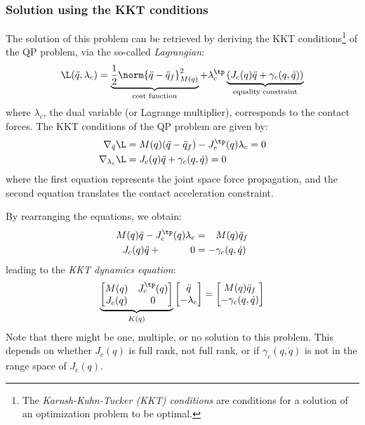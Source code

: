 \subsubsection{Solution using the KKT conditions}
The solution of this problem can be retrieved by deriving the KKT conditions\footnote{The \emph{Karush-Kuhn-Tucker (KKT) conditions} are conditions for a solution of an optimization problem to be optimal.} of the QP problem, via the so-called \emph{Lagrangian}:
\begin{equation*}
    \L(\ddot{q}, \lambda_c) = 
    \underbrace{
        \frac{1}{2}\norm{\ddot{q}-\ddot{q}_f}^2_{M(q)}
     }_{\text{cost function}} + 
     \lambda_c^\tp
     \underbrace{
        \left(J_c(q)\ddot{q} + \gamma_c(q, \dot{q})\right)
     }_{\text{equality constraint}}
\end{equation*}
where $\lambda_c$, the dual variable (or Lagrange multiplier), corresponds to the contact forces. The KKT conditions of the QP problem are given by:
\begin{align}
    \nabla_{\ddot{q}}\L &= M(q)(\ddot{q}-\ddot{q}_f) - J_c^\tp(q)\lambda_c = 0 \\
    \nabla_{\lambda_c}\L &= J_c(q)\ddot{q} + \gamma_c(q, \dot{q}) = 0
\end{align}
where the first equation represents the joint space force propagation, and the second equation translates the contact acceleration constraint.

By rearranging the equations, we obtain:
\begin{align*}
    M(q)\ddot{q} - J_c^\tp(q)\lambda_c &= \phantom{-}M(q)\ddot{q}_f\\
    J_c(q)\ddot{q} + \qquad\quad0 &= -\gamma_c(q, \dot{q})
\end{align*}
leading to the \emph{KKT dynamics equation}:
\begin{equation}
    \underbrace{\begin{bmatrix}
        M(q) & J_c^\tp(q) \\
        J_c(q) & 0
    \end{bmatrix}}_{K(q)}
    \begin{bmatrix}
        \ddot{q} \\
        -\lambda_c
    \end{bmatrix} =
    \begin{bmatrix}
        M(q)\ddot{q}_f \\
        -\gamma_c(q, \dot{q})
    \end{bmatrix}
\end{equation}
Note that there might be one, multiple, or no solution to this problem. This depends on whether $J_c(q)$ is full rank, not full rank, or if $\gamma_c(q, \dot{q})$ is not in the range space of $J_c(q)$.

